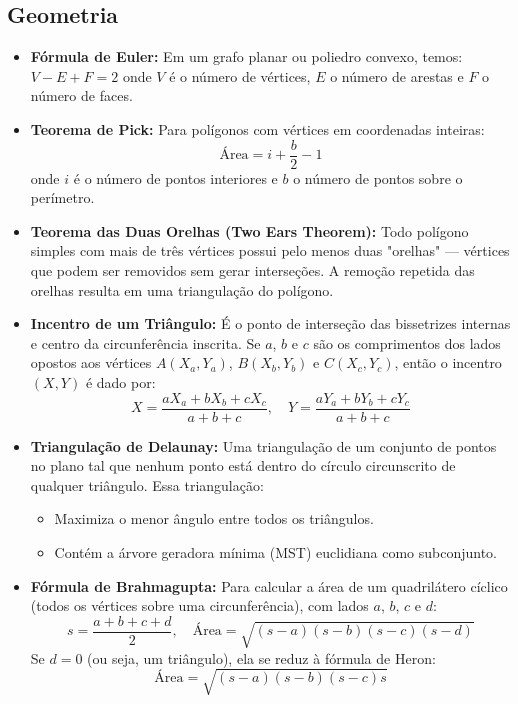 \subsection{Geometria}

\begin{small}
\begin{itemize}
    \item \textbf{Fórmula de Euler:} Em um grafo planar ou poliedro convexo, temos:
    $ V - E + F = 2 $
    onde $V$ é o número de vértices, $E$ o número de arestas e $F$ o número de faces.

    \item \textbf{Teorema de Pick:} Para polígonos com vértices em coordenadas inteiras:
    \[
    \text{Área} = i + \frac{b}{2} - 1
    \]
    onde $i$ é o número de pontos interiores e $b$ o número de pontos sobre o perímetro.

    \item \textbf{Teorema das Duas Orelhas (Two Ears Theorem):} Todo polígono simples com mais de três vértices possui pelo menos duas "orelhas" — vértices que podem ser removidos sem gerar interseções. A remoção repetida das orelhas resulta em uma triangulação do polígono.

    \item \textbf{Incentro de um Triângulo:} É o ponto de interseção das bissetrizes internas e centro da circunferência inscrita. Se $a$, $b$ e $c$ são os comprimentos dos lados opostos aos vértices $A(X_a, Y_a)$, $B(X_b, Y_b)$ e $C(X_c, Y_c)$, então o incentro $(X, Y)$ é dado por:
    \[
    X = \frac{aX_a + bX_b + cX_c}{a + b + c}, \quad
    Y = \frac{aY_a + bY_b + cY_c}{a + b + c}
    \]

    \item \textbf{Triangulação de Delaunay:} Uma triangulação de um conjunto de pontos no plano tal que nenhum ponto está dentro do círculo circunscrito de qualquer triângulo. Essa triangulação:
    \begin{itemize}
        \item Maximiza o menor ângulo entre todos os triângulos.
        \item Contém a árvore geradora mínima (MST) euclidiana como subconjunto.
    \end{itemize}

    \item \textbf{Fórmula de Brahmagupta:} Para calcular a área de um quadrilátero cíclico (todos os vértices sobre uma circunferência), com lados $a$, $b$, $c$ e $d$:
    \[
    s = \frac{a + b + c + d}{2}, \quad
    \text{Área} = \sqrt{(s - a)(s - b)(s - c)(s - d)}
    \]
    Se $d = 0$ (ou seja, um triângulo), ela se reduz à fórmula de Heron:
    \[
    \text{Área} = \sqrt{(s - a)(s - b)(s - c)s}
    \]
\end{itemize}
\end{small}

